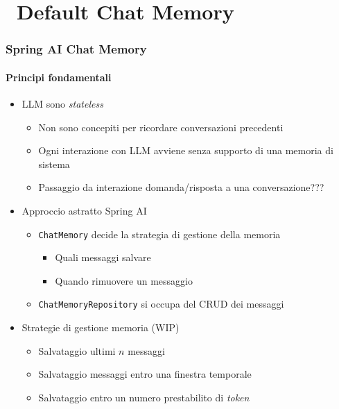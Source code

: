 \section{\faWrench\ Default Chat Memory} %
\label{sec:spring-ai-default-chat-memory}
%
\begin{frame}[t,fragile] \frametitle{Spring AI Chat Memory}
    \framesubtitle{Principi fondamentali}
    {\footnotesize
    \begin{itemize}[leftmargin=10pt,align=right]
        \item[\alert{\faExclamationTriangle}] LLM sono \alert{\textit{stateless}}
        \begin{itemize}[leftmargin=10pt,align=right]
            \item[\alert{\faArrowCircleRight}] Non sono concepiti per ricordare conversazioni precedenti
            \item[\alert{\faArrowCircleRight}] Ogni interazione con LLM avviene senza supporto di una memoria di sistema
            \item[\alert{\faExclamationTriangle}] Passaggio da \alert{interazione domanda/risposta} a una \alert{conversazione}???
        \end{itemize}
        \item[\alert{\faArrowCircleRight}] Approccio astratto Spring AI
        \begin{itemize}[leftmargin=10pt,align=right]
            \item[\alert{\faArrowCircleRight}] \alert{\texttt{ChatMemory}} decide la \alert{strategia} di gestione della memoria
            \begin{itemize}[leftmargin=10pt,align=right]
                \item[\alert{\faArrowCircleRight}] Quali messaggi salvare
                \item[\alert{\faArrowCircleRight}] Quando rimuovere un messaggio
        \end{itemize}
            \item[\alert{\faArrowCircleRight}] \alert{\texttt{ChatMemoryRepository}} si occupa del CRUD dei messaggi
        \end{itemize}
        \item[\alert{\faArrowCircleRight}] Strategie di gestione memoria (WIP)
        \begin{itemize}[leftmargin=10pt,align=right]
            \item[\alertedcircled{1}] Salvataggio ultimi $n$ messaggi
            \item[\alertedcircled{2}] Salvataggio messaggi entro una finestra temporale
            \item[\alertedcircled{3}] Salvataggio entro un numero prestabilito di \textit{token}
        \end{itemize}
    \end{itemize}
    }
\end{frame}
